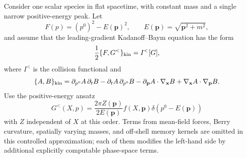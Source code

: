 \begin{controlledapproximation}
\label{ca:kinetic-force-free-quasiparticle-projection}
Consider one scalar species in flat spacetime, with constant mass and a
single narrow positive-energy peak.  Let
\begin{equation}
  F(p)=(p^0)^2-E(\mathbf p)^2,\qquad
  E(\mathbf p)=\sqrt{\mathbf p^2+m^2},
  \label{eq:kinetic-free-mass-shell-function}
\end{equation}
and assume that the leading-gradient Kadanoff--Baym equation has the form
\begin{equation}
  \frac12\{F,G^<\}_{\rm kin}=I^<[G],
  \label{eq:kinetic-leading-kb-force-free}
\end{equation}
where \(I^<\) is the collision functional and
\begin{equation}
  \{A,B\}_{\rm kin}
  =
  \partial_{p^0}A\,\partial_tB
  -\partial_tA\,\partial_{p^0}B
  -\partial_{\mathbf p}A\cdot\nabla_{\mathbf x}B
  +\nabla_{\mathbf x}A\cdot\nabla_{\mathbf p}B .
  \label{eq:kinetic-poisson-bracket-convention}
\end{equation}
Use the positive-energy ansatz
\begin{equation}
  G^<(X,p)=
  \frac{2\pi Z(\mathbf p)}{2E(\mathbf p)}
  f(X,\mathbf p)\delta(p^0-E(\mathbf p))
  \label{eq:kinetic-positive-energy-lesser-ansatz}
\end{equation}
with \(Z\) independent of \(X\) at this order.  Terms from mean-field
forces, Berry curvature, spatially varying masses, and off-shell memory
kernels are omitted in this controlled approximation; each of them modifies
the left-hand side by additional explicitly computable phase-space terms.
\end{controlledapproximation}

